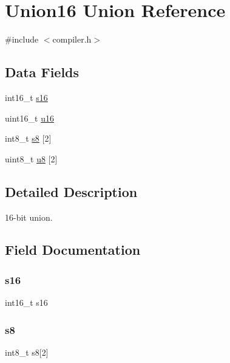 \hypertarget{union_union16}{}\section{Union16 Union Reference}
\label{union_union16}


{\ttfamily \#include $<$compiler.\+h$>$}

\subsection*{Data Fields}
\begin{DoxyCompactItemize}
\item 
int16\+\_\+t \mbox{\hyperlink{union_union16_adbbcd82ccbf61d179ba87ee5fe1bb7d8}{s16}}
\item 
uint16\+\_\+t \mbox{\hyperlink{union_union16_a1234f83efa812e259523c91799614a3c}{u16}}
\item 
int8\+\_\+t \mbox{\hyperlink{union_union16_aa63fa1dc73d574de52f7192acec760d7}{s8}} \mbox{[}2\mbox{]}
\item 
uint8\+\_\+t \mbox{\hyperlink{union_union16_ab3d8a7b8ba33f3e22f0dc5376bdbee6d}{u8}} \mbox{[}2\mbox{]}
\end{DoxyCompactItemize}


\subsection{Detailed Description}
16-\/bit union. 

\subsection{Field Documentation}
\mbox{\label{union_union16_adbbcd82ccbf61d179ba87ee5fe1bb7d8}} 
\subsubsection{\texorpdfstring{s16}{s16}}
{\footnotesize\ttfamily int16\+\_\+t s16}

\mbox{\label{union_union16_aa63fa1dc73d574de52f7192acec760d7}} 
\subsubsection{\texorpdfstring{s8}{s8}}
{\footnotesize\ttfamily int8\+\_\+t s8\mbox{[}2\mbox{]}}

